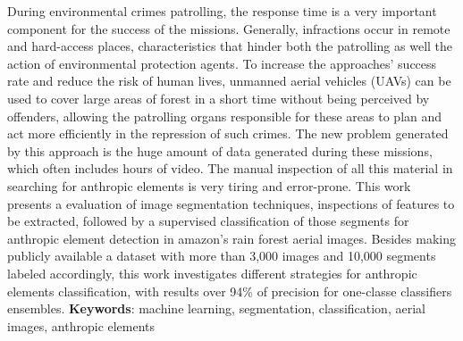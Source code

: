 \begin{resumo}[Abstract]
    During environmental crimes patrolling, the response time is a very important component for the success of the missions. Generally, infractions occur in remote and hard-access places, characteristics that hinder both the patrolling as well the action of environmental protection agents. To increase the approaches' success rate and reduce the risk of human lives, unmanned aerial vehicles (UAVs) can be used to cover large areas of forest in a short time without being perceived by offenders, allowing the patrolling organs responsible for these areas to plan and act more efficiently in the repression of such crimes. The new problem generated by this approach is the huge amount of data generated during these missions, which often includes hours of video. The manual inspection of all this material in searching for anthropic elements is very tiring and error-prone. This work presents a evaluation of image segmentation techniques, inspections of features to be extracted, followed by a supervised classification of those segments for anthropic element detection in amazon's rain forest aerial images. Besides making publicly available a dataset with more than 3,000 images and 10,000 segments labeled accordingly, this work investigates different strategies for anthropic elements classification, with results over 94\% of precision for one-classe classifiers ensembles.
    \vspace{\onelineskip}
    \noindent
    \textbf{Keywords}: machine learning, segmentation, classification, aerial images, anthropic elements
\end{resumo}
